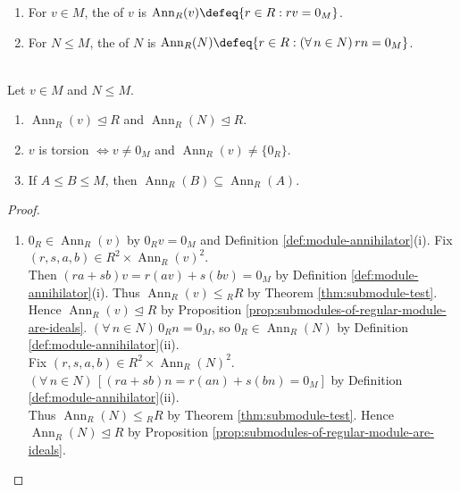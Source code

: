 \begin{definition} \label{def:module-annihilator} 
\begin{enumerate}[label=(\roman*)]
\setlength{\itemsep}{0pt}
\item For $v\in M$, the  of $v$ is $\operatorname{Ann}_R(v)\defeq\{r\in R:rv=0_M\}$.
\item For $N\leq M$, the  of $N$ is $\operatorname{Ann}_R(N)\defeq\{r\in R:(\forall\,n\in N)\,rn=0_M\}$.
\end{enumerate}
\end{definition}

\begin{proposition} \label{prop:annihilator-basic-properties} \\
Let $v\in M$ and $N\leq M$.
\begin{enumerate}[label=(\roman*)]
\setlength{\itemsep}{0pt}
\item $\operatorname{Ann}_R(v)\trianglelefteq R$ and $\operatorname{Ann}_R(N)\trianglelefteq R$.
\item $v$ is torsion $\Longleftrightarrow v\neq0_M$ and $\operatorname{Ann}_R(v)\neq\{0_R\}$.
\item If $A\leq B\leq M$, then $\operatorname{Ann}_R(B)\subseteq\operatorname{Ann}_R(A)$.
\end{enumerate}
\begin{proof}
\begin{enumerate}[label=(\roman*)]
\setlength{\itemsep}{0pt}
\item[$(i)$] $0_R\in\operatorname{Ann}_R(v)$ by $0_Rv=0_M$ and Definition \ref{def:module-annihilator}(i). Fix $(r,s,a,b)\in R^2\times\operatorname{Ann}_R(v)^2$.\\
Then $(ra+sb)v=r(av)+s(bv)=0_M$ by Definition \ref{def:module-annihilator}(i). Thus $\operatorname{Ann}_R(v)\leq{}_R R$ by Theorem \ref{thm:submodule-test}.\\
Hence $\operatorname{Ann}_R(v)\trianglelefteq R$ by Proposition \ref{prop:submodules-of-regular-module-are-ideals}. $(\forall\,n\in N)\,0_Rn=0_M$, so $0_R\in\operatorname{Ann}_R(N)$ by Definition \ref{def:module-annihilator}(ii).\\
Fix $(r,s,a,b)\in R^2\times\operatorname{Ann}_R(N)^2$. $(\forall\,n\in N)\,[(ra+sb)n=r(an)+s(bn)=0_M]$ by Definition \ref{def:module-annihilator}(ii).\\
Thus $\operatorname{Ann}_R(N)\leq{}_R R$ by Theorem \ref{thm:submodule-test}. Hence $\operatorname{Ann}_R(N)\trianglelefteq R$ by Proposition \ref{prop:submodules-of-regular-module-are-ideals}.

\end{enumerate}
\end{proof}
\end{proposition}
